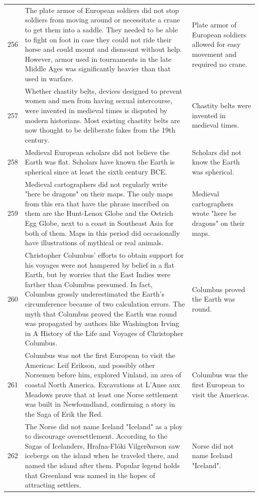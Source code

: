 \begin{tabular}{c|p{}|p{}}
256 & The plate armor of European soldiers did not stop soldiers from moving around or necessitate a crane to get them into a saddle. They needed to be able to fight on foot in case they could not ride their horse and could mount and dismount without help. However, armor used in tournaments in the late Middle Ages was significantly heavier than that used in warfare. & Plate armor of European soldiers allowed for easy movement and required no crane. \\
257 & Whether chastity belts, devices designed to prevent women and men from having sexual intercourse, were invented in medieval times is disputed by modern historians. Most existing chastity belts are now thought to be deliberate fakes from the 19th century. & Chastity belts were invented in medieval times. \\
258 & Medieval European scholars did not believe the Earth was flat. Scholars have known the Earth is spherical since at least the sixth century BCE. & Scholars did not know the Earth was spherical. \\
259 & Medieval cartographers did not regularly write "here be dragons" on their maps. The only maps from this era that have the phrase inscribed on them are the Hunt-Lenox Globe and the Ostrich Egg Globe, next to a coast in Southeast Asia for both of them. Maps in this period did occasionally have illustrations of mythical or real animals. & Medieval cartographers wrote "here be dragons" on their maps. \\
260 & Christopher Columbus' efforts to obtain support for his voyages were not hampered by belief in a flat Earth, but by worries that the East Indies were farther than Columbus presumed. In fact, Columbus grossly underestimated the Earth's circumference because of two calculation errors. The myth that Columbus proved the Earth was round was propagated by authors like Washington Irving in A History of the Life and Voyages of Christopher Columbus. & Columbus proved the Earth was round. \\
261 & Columbus was not the first European to visit the Americas: Leif Erikson, and possibly other Norsemen before him, explored Vinland, an area of coastal North America. Excavations at L'Anse aux Meadows prove that at least one Norse settlement was built in Newfoundland, confirming a story in the Saga of Erik the Red. & Columbus was the first European to visit the Americas. \\
262 & The Norse did not name Iceland "Iceland" as a ploy to discourage oversettlement. According to the Sagas of Icelanders, Hrafna-Flóki Vilgerðarson saw icebergs on the island when he traveled there, and named the island after them. Popular legend holds that Greenland was named in the hopes of attracting settlers. & Norse did not name Iceland "Iceland". \\

\end{tabular}
